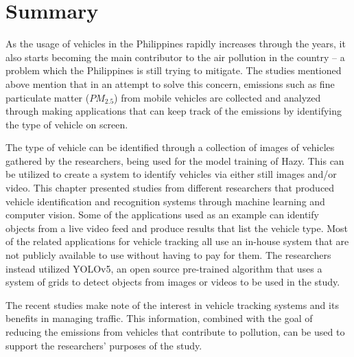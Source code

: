 \section{Summary}
 As the usage of vehicles in the Philippines rapidly increases through the years, it also starts becoming the main contributor to the air pollution in the country – a problem which the Philippines is still trying to mitigate. The studies mentioned above mention that in an attempt to solve this concern, emissions such as fine particulate matter ($PM_{2.5}$) from mobile vehicles are collected and analyzed through making applications that can keep track of the emissions by identifying the type of vehicle on screen.

	The type of vehicle can be identified through a collection of images of vehicles gathered by the researchers, being used for the model training of Hazy.  This can be utilized to create a system to identify vehicles via either still images and/or video. This chapter presented studies from different researchers that produced vehicle identification and recognition systems through machine learning and computer vision. Some of the applications used as an example can identify objects from a live video feed and produce results that list the vehicle type. Most of the related applications for vehicle tracking all use an in-house system that are  not publicly available to use without having to pay for them. The researchers instead utilized YOLOv5, an open source pre-trained algorithm that uses a system of grids to detect objects from images or videos to be used in the study.
	

	The recent studies make note of the interest in vehicle tracking systems and its benefits in managing traffic. This information, combined with the goal of reducing the emissions from vehicles that contribute to pollution, can be used to support the researchers’ purposes of the study.



